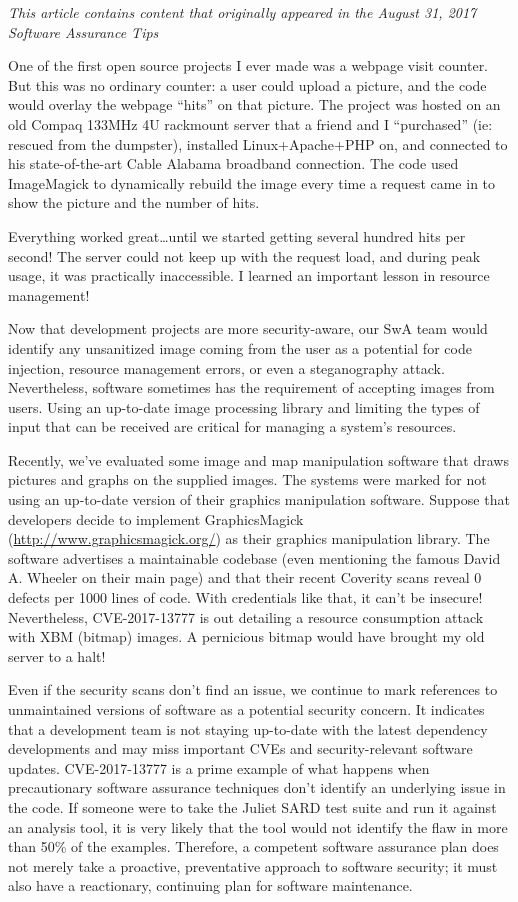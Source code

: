 \textit{This article contains content that originally appeared in the August 31, 2017 Software Assurance Tips}

One of the first open source projects I ever made was a webpage visit counter. But this was no ordinary counter: a user could upload a picture, and the code would overlay the webpage ``hits'' on that picture. The project was hosted on an old Compaq 133MHz 4U rackmount server that a friend and I ``purchased'' (ie: rescued from the dumpster), installed Linux+Apache+PHP on, and connected to his state-of-the-art Cable Alabama broadband connection. The code used ImageMagick to dynamically rebuild the image every time a request came in to show the picture and the number of hits.

Everything worked great\ldots until we started getting several hundred hits per second! The server could not keep up with the request load, and during peak usage, it was practically inaccessible. I learned an important lesson in resource management!

Now that development projects are more security-aware, our SwA team would identify any unsanitized image coming from the user as a potential for code injection, resource management errors, or even a steganography attack. Nevertheless, software sometimes has the requirement of accepting images from users. Using an up-to-date image processing library and limiting the types of input that can be received are critical for managing a system's resources.

Recently, we've evaluated some image and map manipulation software that draws pictures and graphs on the supplied images. The systems were marked for not using an up-to-date version of their graphics manipulation software. Suppose that developers decide to implement GraphicsMagick (\url{http://www.graphicsmagick.org/}) as their graphics manipulation library. The software advertises a maintainable codebase (even mentioning the famous David A. Wheeler on their main page) and that their recent Coverity scans reveal 0 defects per 1000 lines of code. With credentials like that, it can't be insecure! Nevertheless, CVE-2017-13777 is out detailing a resource consumption attack with XBM (bitmap) images.\autocite{20210906:CVE-2017-13777} A pernicious bitmap would have brought my old server to a halt!

Even if the security scans don't find an issue, we continue to mark references to unmaintained versions of software as a potential security concern. It indicates that a development team is not staying up-to-date with the latest dependency developments and may miss important CVEs and security-relevant software updates. CVE-2017-13777 is a prime example of what happens when precautionary software assurance techniques don't identify an underlying issue in the code. If someone were to take the Juliet SARD test suite and run it against an analysis tool, it is very likely that the tool would not identify the flaw in more than 50\% of the examples. Therefore, a competent software assurance plan does not merely take a proactive, preventative approach to software security; it must also have a reactionary, continuing plan for software maintenance.

